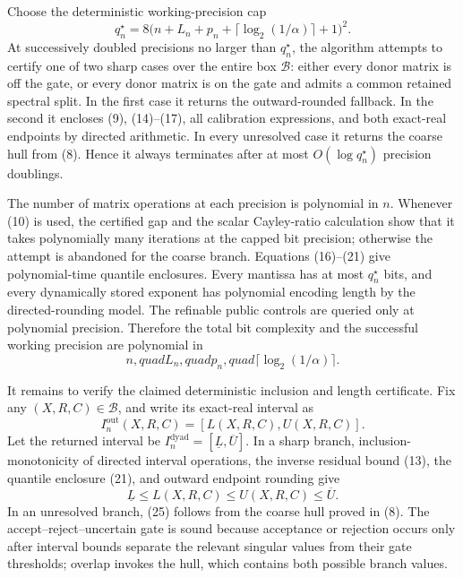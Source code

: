 Choose the deterministic working-precision cap
\[
q_n^\star=
8\bigl(n+L_n+p_n+\lceil\log_2(1/\alpha)\rceil+1\bigr)^2.
\tag{23}
\]
At successively doubled precisions no larger than \(q_n^\star\), the algorithm attempts to certify one of two sharp cases over the entire box \(\mathcal B\): either every donor matrix is off the gate, or every donor matrix is on the gate and admits a common retained spectral split. In the first case it returns the outward-rounded fallback. In the second it encloses (9), (14)--(17), all calibration expressions, and both exact-real endpoints by directed arithmetic. In every unresolved case it returns the coarse hull from (8). Hence it always terminates after at most \(O(\log q_n^\star)\) precision doublings.

The number of matrix operations at each precision is polynomial in \(n\). Whenever (10) is used, the certified gap and the scalar Cayley-ratio calculation show that it takes polynomially many iterations at the capped bit precision; otherwise the attempt is abandoned for the coarse branch. Equations (16)--(21) give polynomial-time quantile enclosures. Every mantissa has at most \(q_n^\star\) bits, and every dynamically stored exponent has polynomial encoding length by the directed-rounding model. The refinable public controls are queried only at polynomial precision. Therefore the total bit complexity and the successful working precision are polynomial in
\[
n,quad L_n,quad p_n,quad
\lceil\log_2(1/\alpha)\rceil.
\tag{24}
\]

It remains to verify the claimed deterministic inclusion and length certificate. Fix any \((X,R,C)\in\mathcal B\), and write its exact-real interval as
\[
I_n^{\mathrm{out}}(X,R,C)=[L(X,R,C),U(X,R,C)].
\]
Let the returned interval be \(I_n^{\mathrm{dyad}}=[\underline L,\overline U]\). In a sharp branch, inclusion-monotonicity of directed interval operations, the inverse residual bound (13), the quantile enclosure (21), and outward endpoint rounding give
\[
\underline L\le L(X,R,C)\le U(X,R,C)\le\overline U.
\tag{25}
\]
In an unresolved branch, (25) follows from the coarse hull proved in (8). The accept--reject--uncertain gate is sound because acceptance or rejection occurs only after interval bounds separate the relevant singular values from their gate thresholds; overlap invokes the hull, which contains both possible branch values.

